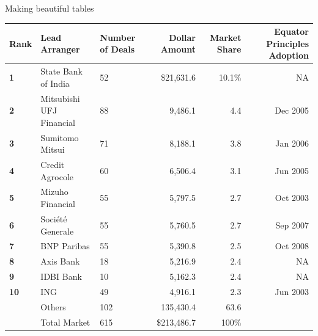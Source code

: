 \begin{frame}[fragile]{Making beautiful tables}
{\begin{tabular}{@{}lllrrr@{}}\toprule
\textbf{Rank} & \textbf{Lead Arranger} & \textbf{Number of Deals} & \textbf{Dollar Amount} & \textbf{Market Share} & \textbf{Equator Principles Adoption}\\ \midrule
\textbf{1} & State Bank of India & 52 & \$21,631.6 & 10.1\% & NA\\ \hdashline
\textbf{2} & Mitsubishi UFJ Financial & 88 & 9,486.1 & 4.4 & Dec 2005\\ \hdashline
\textbf{3} & Sumitomo Mitsui & 71 & 8,188.1 & 3.8 & Jan 2006\\ \hdashline
\textbf{4} & Credit Agrocole & 60 & 6,506.4 & 3.1 & Jun 2005\\ \hdashline
\textbf{5} & Mizuho Financial & 55 & 5,797.5 & 2.7 & Oct 2003\\ \hdashline
\textbf{6} & Soci\'{e}t\'{e} Generale & 55 & 5,760.5 & 2.7 & Sep 2007\\ \hdashline
\textbf{7} & BNP Paribas & 55 & 5,390.8 & 2.5 & Oct 2008\\ \hdashline
\textbf{8} & Axis Bank & 18 & 5,216.9 & 2.4 & NA\\ \hdashline
\textbf{9} & IDBI Bank & 10 & 5,162.3 & 2.4 & NA\\ \hdashline
\textbf{10} & ING & 49 & 4,916.1 & 2.3 & Jun 2003\\ \midrule
 & Others & 102 & 135,430.4 & 63.6 & \\ \midrule
 & Total Market & 615 & \$213,486.7 & 100\% & \\
\bottomrule
\end{tabular}
}
\end{frame}
